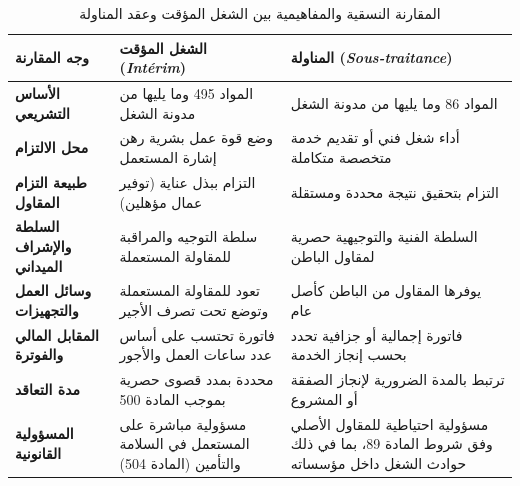 \begin{table}[htbp]
\centering
\small
\renewcommand{\arraystretch}{1.55}
\begin{tabularx}{\textwidth}{|p{2.8cm}|X|X|}
\hline
\textbf{وجه المقارنة} & \textbf{الشغل المؤقت (\textit{Intérim})} & \textbf{المناولة (\textit{Sous-traitance})} \\
\hline
\textbf{الأساس التشريعي} & المواد \textenglish{495} وما يليها من مدونة الشغل & المواد \textenglish{86} وما يليها من مدونة الشغل \\
\hline
\textbf{محل الالتزام} & وضع قوة عمل بشرية رهن إشارة المستعمل & أداء شغل فني أو تقديم خدمة متخصصة متكاملة \\
\hline
\textbf{طبيعة التزام المقاول} & التزام ببذل عناية (توفير عمال مؤهلين) & التزام بتحقيق نتيجة محددة ومستقلة \\
\hline
\textbf{السلطة والإشراف الميداني} & سلطة التوجيه والمراقبة للمقاولة المستعملة & السلطة الفنية والتوجيهية حصرية لمقاول الباطن \\
\hline
\textbf{وسائل العمل والتجهيزات} & تعود للمقاولة المستعملة وتوضع تحت تصرف الأجير & يوفرها المقاول من الباطن كأصل عام \\
\hline
\textbf{المقابل المالي والفوترة} & فاتورة تحتسب على أساس عدد ساعات العمل والأجور & فاتورة إجمالية أو جزافية تحدد بحسب إنجاز الخدمة \\
\hline
\textbf{مدة التعاقد} & محددة بمدد قصوى حصرية بموجب المادة \textenglish{500} & ترتبط بالمدة الضرورية لإنجاز الصفقة أو المشروع \\
\hline
\textbf{المسؤولية القانونية} & مسؤولية مباشرة على المستعمل في السلامة والتأمين (المادة \textenglish{504}) & مسؤولية احتياطية للمقاول الأصلي وفق شروط المادة \textenglish{89}، بما في ذلك حوادث الشغل داخل مؤسساته \\
\hline
\end{tabularx}
\caption{المقارنة النسقية والمفاهيمية بين الشغل المؤقت وعقد المناولة}
\label{tab:comparatif-detaille}
\end{table}

